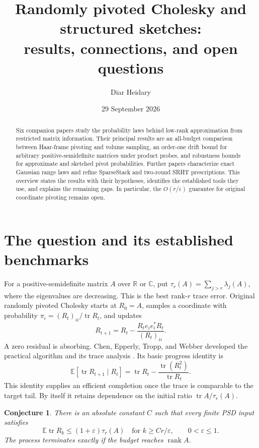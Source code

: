 \documentclass[11pt,a4paper]{article}
\title{Randomly pivoted Cholesky and structured sketches:\\ results, connections, and open questions}
\author{Diar Heidary}
\date{29 September 2026}
\newtheorem{conjecture}{Conjecture}[section]
\newcommand{\E}{\mathbb E}
\newcommand{\tr}{\operatorname{tr}}
\newcommand{\rank}{\operatorname{rank}}
\newcommand{\eps}{\varepsilon}
\begin{document}
\maketitle
\begin{abstract}
Six companion papers study the probability laws behind low-rank
approximation from restricted matrix information. Their principal results
are an all-budget comparison between Haar-frame pivoting and volume
sampling, an order-one drift bound for arbitrary positive-semidefinite
matrices under product probes, and robustness bounds for approximate and
sketched pivot probabilities. Further papers characterize exact Gaussian
range laws and refine SparseStack and two-round SRHT prescriptions. This
overview states the results with their hypotheses, identifies the
established tools they use, and explains the remaining gaps. In particular,
the $O(r/\eps)$ guarantee for original coordinate pivoting remains open.
\end{abstract}
\tableofcontents

\section{The question and its established benchmarks}
For a positive-semidefinite matrix $A$ over $\mathbb R$ or $\mathbb C$, put
$\tau_r(A)=\sum_{j>r}\lambda_j(A)$, where the eigenvalues are decreasing.
This is the best rank-$r$ trace error. Original randomly pivoted Cholesky
starts at $R_0=A$, samples a coordinate with probability
$\pi_i=(R_t)_{ii}/\tr R_t$, and updates
\begin{equation}\label{eq:rp}
 R_{t+1}=R_t-\frac{R_te_ie_i^*R_t}{(R_t)_{ii}}.
\end{equation}
A zero residual is absorbing. Chen, Epperly, Tropp, and Webber developed
the practical algorithm and its trace analysis \cite{CETW}. Its basic
progress identity is
\begin{equation}\label{eq:drift}
 \E[\tr R_{t+1}\mid R_t]
 =\tr R_t-\frac{\tr(R_t^2)}{\tr R_t}.
\end{equation}
This identity supplies an efficient completion once the trace is comparable
to the target tail. By itself it retains dependence on the initial ratio
$\tr A/\tau_r(A)$.

\begin{conjecture}\label{conj:rp}
There is an absolute constant $C$ such that every finite PSD input satisfies
\[
 \E\tr R_k\le(1+\eps)\tau_r(A)
 \quad\text{for }k\ge Cr/\eps,\qquad 0<\eps\le1.
\]
The process terminates exactly if the budget reaches $\rank A$.
\end{conjecture}
\end{document}
